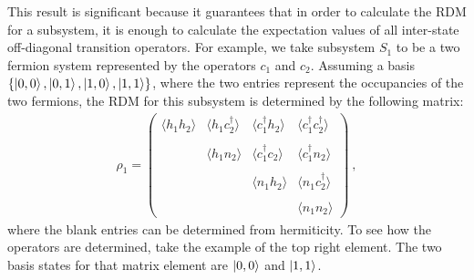 This result is significant because it guarantees that in order to calculate the RDM for a subsystem, it is enough to calculate the expectation values of all inter-state off-diagonal transition operators. For example, we take subsystem \(S_1\) to be a two fermion system represented by the operators \(c_1\) and \(c_2\). Assuming a basis \(\left\{\ket{0,0}, \ket{0, 1}, \ket{1, 0}, \ket{1, 1}\right\}\), where the two entries represent the occupancies of the two fermions, the RDM for this subsystem is determined by the following matrix:
\begin{equation}\begin{aligned}
	\rho_1 = \begin{pmatrix}
		\langle h_1 h_2 \rangle & \langle h_1 c_2^\dagger \rangle & \langle c^\dagger_1 h_2 \rangle & \langle c_1^\dagger c_2^\dagger \rangle \\\\
								& \langle h_1 n_2 \rangle & \langle c^\dagger_1 c_2 \rangle & \langle c_1^\dagger n_2 \rangle \\\\
								&& \langle n_1 h_2 \rangle & \langle n_1 c_2^\dagger \rangle \\\\
								&&& \langle n_1 n_2 \rangle
	\end{pmatrix}~,
\end{aligned}\end{equation}
where the blank entries can be determined from hermiticity. To see how the operators  are determined, take the example of the top right element. The two basis states for that matrix element are \(\ket{0, 0}\) and \(\ket{1, 1}\). 

